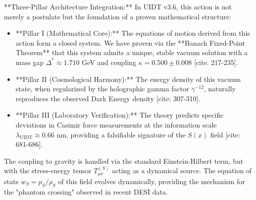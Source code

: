 **Three-Pillar Architecture Integration:**
In UIDT v3.6, this action is not merely a postulate but the foundation of a proven mathematical structure:
\begin{itemize}
    \item **Pillar I (Mathematical Core):** The equations of motion derived from this action form a closed system. We have proven via the **Banach Fixed-Point Theorem** that this system admits a unique, stable vacuum solution with a mass gap $\Delta^* \approx 1.710$ GeV and coupling $\kappa = 0.500 \pm 0.008$ [cite: 217-235].
    \item **Pillar II (Cosmological Harmony):** The energy density of this vacuum state, when regularized by the holographic gamma factor $\gamma^{-12}$, naturally reproduces the observed Dark Energy density [cite: 307-310].
    \item **Pillar III (Laboratory Verification):** The theory predicts specific deviations in Casimir force measurements at the information scale $\lambda_{\mathrm{UIDT}} \approx 0.66$ nm, providing a falsifiable signature of the $S(x)$ field [cite: 681-686].
\end{itemize}

The coupling to gravity is handled via the standard Einstein-Hilbert term, but with the stress-energy tensor $T_{\mu\nu}^{(S)}$ acting as a dynamical source. The equation of state $w_S = p_S/\rho_S$ of this field evolves dynamically, providing the mechanism for the "phantom crossing" observed in recent DESI data.